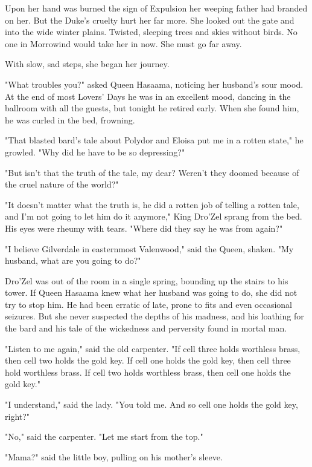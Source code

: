 Upon her hand was burned the sign of Expulsion her weeping father had branded on her. But the Duke's cruelty hurt her far more. She looked out the gate and into the wide winter plains. Twisted, sleeping trees and skies without birds. No one in Morrowind would take her in now. She must go far away.

With slow, sad steps, she began her journey.

"What troubles you?" asked Queen Hasaama, noticing her husband's sour mood. At the end of most Lovers' Days he was in an excellent mood, dancing in the ballroom with all the guests, but tonight he retired early. When she found him, he was curled in the bed, frowning.

"That blasted bard's tale about Polydor and Eloisa put me in a rotten state," he growled. "Why did he have to be so depressing?"

"But isn't that the truth of the tale, my dear? Weren't they doomed because of the cruel nature of the world?"

"It doesn't matter what the truth is, he did a rotten job of telling a rotten tale, and I'm not going to let him do it anymore," King Dro'Zel sprang from the bed. His eyes were rheumy with tears. "Where did they say he was from again?"

"I believe Gilverdale in easternmost Valenwood," said the Queen, shaken. "My husband, what are you going to do?"

Dro'Zel was out of the room in a single spring, bounding up the stairs to his tower. If Queen Hasaama knew what her husband was going to do, she did not try to stop him. He had been erratic of late, prone to fits and even occasional seizures. But she never suspected the depths of his madness, and his loathing for the bard and his tale of the wickedness and perversity found in mortal man.

"Listen to me again," said the old carpenter. "If cell three holds worthless brass, then cell two holds the gold key. If cell one holds the gold key, then cell three hold worthless brass. If cell two holds worthless brass, then cell one holds the gold key."

"I understand," said the lady. "You told me. And so cell one holds the gold key, right?"

"No," said the carpenter. "Let me start from the top."

"Mama?" said the little boy, pulling on his mother's sleeve.

